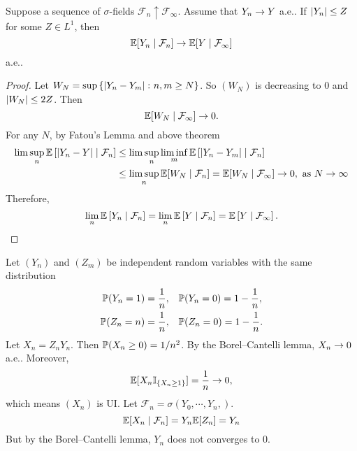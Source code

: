 \begin{thm}
    Suppose a sequence of $\sigma$-fields $\mathcal{F}_n \uparrow \mathcal{F}_\infty$. Assume that $Y_n \rightarrow Y$ a.e.. If $\left\lvert Y_n\right\lvert \leq Z$ for some $Z \in L^1$, then
    \begin{equation*}
        \mathbb{E}[Y_n \mid \mathcal{F}_n] \rightarrow \mathbb{E}[Y \mid \mathcal{F}_\infty]
    \end{equation*}
    a.e..
\end{thm}
\begin{proof}
    Let $W_N = \sup \left\{\left\lvert Y_n - Y_m\right\lvert \colon n,m \geq N\right\}$. So $(W_N)$ is decreasing to $0$ and $\left\lvert W_N\right\lvert \leq 2Z$. Then
    \begin{equation*}
        \mathbb{E}[W_N \mid \mathcal{F}_\infty] \rightarrow 0.
    \end{equation*}
    For any $N$, by Fatou's Lemma and above theorem
    \begin{equation*}
        \begin{aligned}
            \lim\sup_n \mathbb{E}\left[\left\lvert Y_n - Y\right\lvert \mid \mathcal{F}_n\right] &\leq \lim\sup_n \liminf_m \mathbb{E}\left[\left\lvert Y_n - Y_m\right\lvert \mid \mathcal{F}_n\right] \\
            &\leq \limsup_n \mathbb{E}[W_N \mid \mathcal{F}_n] = \mathbb{E}[W_N \mid \mathcal{F}_\infty] \rightarrow 0,\text{ as } N \rightarrow \infty
        \end{aligned}
    \end{equation*}
    Therefore,
    \begin{equation*}
        \lim_n\mathbb{E}\left[Y_n \mid \mathcal{F}_n\right] = \lim_n\mathbb{E}\left[Y \mid \mathcal{F}_n\right] = \mathbb{E}\left[Y \mid \mathcal{F}_\infty\right].
    \end{equation*}
\end{proof}

\begin{exam}
    Let $(Y_n)$ and $(Z_m)$ be independent random variables with the same distribution
    \begin{equation*}
        \begin{aligned}
            \mathbb{P}(Y_n = 1) = \frac{1}{n},&\quad \mathbb{P}(Y_n = 0) = 1-\frac{1}{n}, \\
            \mathbb{P}(Z_n = n) = \frac{1}{n},&\quad \mathbb{P}(Z_n = 0) = 1-\frac{1}{n}.
        \end{aligned}
    \end{equation*}
    Let $X_n = Z_nY_n$. Then $\mathbb{P}(X_n \geq 0) = 1 / n^2$. By the Borel–Cantelli lemma, $X_n \rightarrow 0$ a.e.. Moreover,
    \begin{equation*}
        \mathbb{E}[X_n\mathbb{I}_{\left\{X_n \geq 1\right\}}] = \frac{1}{n} \rightarrow 0,
    \end{equation*}
    which means $(X_n)$ is UI. Let $\mathcal{F}_n = \sigma(Y_0,\cdots,Y_n,)$.
    \begin{equation*}
        \mathbb{E}[X_n \mid \mathcal{F}_n] = Y_n\mathbb{E}[Z_n] = Y_n
    \end{equation*}
    But by the Borel–Cantelli lemma, $Y_n$ does not converges to $0$.
\end{exam}

